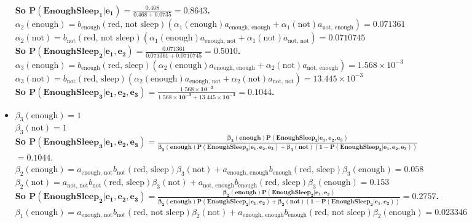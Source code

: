 \documentclass[11pt]{article}
\begin{document}
\begin{onehalfspace}
\begin{itemize}
	\textbf{So $\mathbf{P(EnoughSleep_1|e_1) = \frac{0.468}{0.468+0.0735} = 0.8643}$.}\\
	$\alpha_2(\text{enough}) = b_{\text{enough}}(\text{red, not sleep})(\alpha_1(\text{enough})a_{\text{enough, enough}} + \alpha_1(\text{not})a_{\text{not, enough}}) = 0.071361$\\
	$\alpha_2(\text{not}) = b_{\text{not}}(\text{red, not sleep})(\alpha_1(\text{enough})a_{\text{enough, not}} + \alpha_1(\text{not})a_{\text{not, not}}) = 0.0710745$\\
	\textbf{So $\mathbf{P(EnoughSleep_2|e_1,e_2) = \frac{0.071361}{0.071361+0.0710745} = 0.5010}$.}\\
	$\alpha_3(\text{enough}) = b_{\text{enough}}(\text{red, sleep})(\alpha_2(\text{enough})a_{\text{enough, enough}} + \alpha_2(\text{not})a_{\text{not, enough}}) = 1.568\times10^{-3}$\\
	$\alpha_3(\text{not}) = b_{\text{not}}(\text{red, sleep})(\alpha_2(\text{enough})a_{\text{enough, not}} + \alpha_2(\text{not})a_{\text{not, not}}) = 13.445\times10^{-3}$\\
	\textbf{So $\mathbf{P(EnoughSleep_3|e_1,e_2,e_3) = \frac{1.568\times10^{-3}}{1.568\times10^{-3}+13.445\times10^{-3}} = 0.1044}$.}\\
	\item
	$\beta_3(\text{enough}) = 1$\\
	$\beta_3(\text{not}) = 1$\\
	\textbf{So $\mathbf{P(EnoughSleep_3|e_1,e_2,e_3) = \frac{\beta_3(\text{enough})P(EnoughSleep_3|e_1,e_2,e_3)}{\beta_3(\text{enough})P(EnoughSleep_3|e_1,e_2,e_3)+\beta_3(\text{not})(1-P(EnoughSleep_3|e_1,e_2,e_3))}}$}\\$\mathbf{=0.1044}$.\\
	$\beta_2(\text{enough}) = a_{\text{enough, not}}b_{\text{not}}(\text{red, sleep})\beta_3(\text{not})+a_{\text{enough, enough}}b_{\text{enough}}(\text{red, sleep})\beta_3(\text{enough}) = 0.058$\\
	$\beta_2(\text{not}) = a_{\text{not, not}}b_{\text{not}}(\text{red, sleep})\beta_3(\text{not})+a_{\text{not, enough}}b_{\text{enough}}(\text{red, sleep})\beta_3(\text{enough}) = 0.153$\\
	\textbf{So $\mathbf{P(EnoughSleep_2|e_1,e_2,e_3) = \frac{\beta_2(\text{enough})P(EnoughSleep_2|e_1,e_2)}{\beta_2(\text{enough})P(EnoughSleep_2|e_1,e_2)+\beta_2(\text{not})(1-P(EnoughSleep_2|e_1,e_2))}=0.2757}$.}\\
	$\beta_1(\text{enough}) = a_{\text{enough, not}}b_{\text{not}}(\text{red, not sleep})\beta_2(\text{not})+a_{\text{enough, enough}}b_{\text{enough}}(\text{red, not sleep})\beta_2(\text{enough}) = 0.023346$\\

\end{itemize}
\end{onehalfspace}
\end{document}
